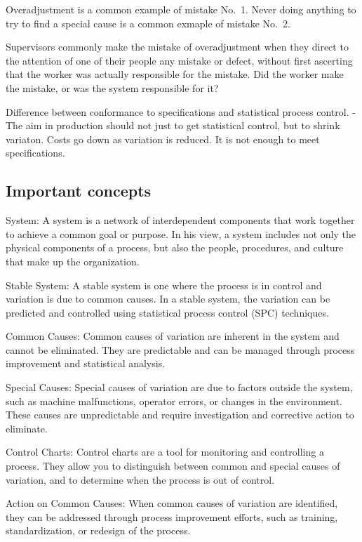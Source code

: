 \documentclass[11pt]{article}
\begin{document}
Overadjustment is a common example of mistake No.~1. Never doing
anything to try to find a special cause is a common exmaple of mistake
No.~2.

Supervisors commonly make the mistake of overadjustment when they direct
to the attention of one of their people any mistake or defect, without
first ascerting that the worker was actually responsible for the
mistake. Did the worker make the mistake, or was the system responsible
for it?

Difference between conformance to specifications and statistical process
control. - The aim in production should not just to get statistical
control, but to shrink variaton. Costs go down as variation is reduced.
It is not enough to meet specifications.

\hypertarget{important-concepts}{%
\subsection{Important concepts}\label{important-concepts}}

System: A system is a network of interdependent components that work
together to achieve a common goal or purpose. In his view, a system
includes not only the physical components of a process, but also the
people, procedures, and culture that make up the organization.

Stable System: A stable system is one where the process is in control
and variation is due to common causes. In a stable system, the variation
can be predicted and controlled using statistical process control (SPC)
techniques.

Common Causes: Common causes of variation are inherent in the system and
cannot be eliminated. They are predictable and can be managed through
process improvement and statistical analysis.

Special Causes: Special causes of variation are due to factors outside
the system, such as machine malfunctions, operator errors, or changes in
the environment. These causes are unpredictable and require
investigation and corrective action to eliminate.

Control Charts: Control charts are a tool for monitoring and controlling
a process. They allow you to distinguish between common and special
causes of variation, and to determine when the process is out of
control.

Action on Common Causes: When common causes of variation are identified,
they can be addressed through process improvement efforts, such as
training, standardization, or redesign of the process.
\end{document}
